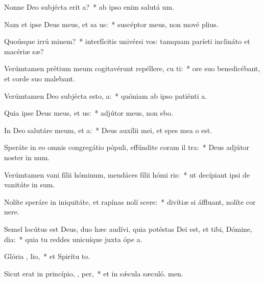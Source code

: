 \item Nonne Deo subjécta erit  a?~* ab ipso enim salutá um.
\item Nam et ipse Deus meus, et sa us:~* suscéptor meus, non mové plius.
\item Quoúsque irrú  minem?~* interfícitis univérsi vos: tamquam paríeti inclináto et macériæ sæ?
\item Verúmtamen prétium meum cogitavérunt repéllere, cu  ti:~* ore suo benedicébant, et corde suo malebant.
\item Verúmtamen Deo subjécta esto,  a:~* quóniam ab ipso patiénti a.
\item Quia ipse Deus meus, et  us:~* adjútor meus, non ebo.
\item In Deo salutáre meum, et  a:~* Deus auxílii mei, et spes mea  o est.
\item Speráte in eo omnis congregátio pópuli, effúndite coram il  tra:~* Deus adjútor noster in num.
\item Verúmtamen vani fílii hóminum, mendáces fílii hómi  ris:~* ut decípiant ipsi de vanitáte in sum.
\item Nolíte speráre in iniquitáte, et rapínas nolí scere:~* divítiæ si áffluant, nolíte cor nere.
\item Semel locútus est Deus, duo hæc audívi, quia potéstas Dei est, et tibi, Dómine, dia:~* quia tu reddes unicuíque juxta ópe a.
\item Glória ,  lio,~* et Spirítu to.
\item Sicut erat in princípio,  ,  per,~* et in sǽcula sæculó. men.
